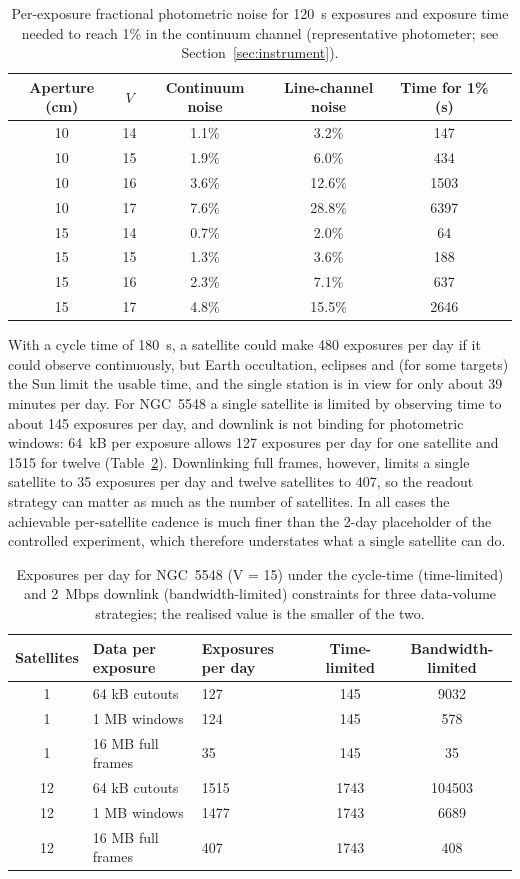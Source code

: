 \documentclass[11pt]{article}
\begin{document}
\begin{table}[htbp]
\centering
\small
\caption{Per-exposure fractional photometric noise for 120~s exposures and exposure time needed to reach 1\% in the continuum channel (representative photometer; see Section~\ref{sec:instrument}).}
\label{tab:budget}
\begin{tabular}{@{}cccccc@{}}
\toprule
Aperture (cm) & $V$ & Continuum noise & Line-channel noise & Time for 1\% (s) \\
\midrule
10 & 14 & 1.1\% & 3.2\% & 147 \\
10 & 15 & 1.9\% & 6.0\% & 434 \\
10 & 16 & 3.6\% & 12.6\% & 1503 \\
10 & 17 & 7.6\% & 28.8\% & 6397 \\
15 & 14 & 0.7\% & 2.0\% & 64 \\
15 & 15 & 1.3\% & 3.6\% & 188 \\
15 & 16 & 2.3\% & 7.1\% & 637 \\
15 & 17 & 4.8\% & 15.5\% & 2646 \\
\bottomrule
\end{tabular}
\end{table}

With a cycle time of 180~s, a satellite could make 480 exposures per day if it could observe continuously, but Earth occultation, eclipses and (for some targets) the Sun limit the usable time, and the single station is in view for only about 39 minutes per day. For NGC~5548 a single satellite is limited by observing time to about 145 exposures per day, and downlink is not binding for photometric windows: 64~kB per exposure allows 127 exposures per day for one satellite and 1515 for twelve (Table~\ref{tab:downlink}). Downlinking full frames, however, limits a single satellite to 35 exposures per day and twelve satellites to 407, so the readout strategy can matter as much as the number of satellites. In all cases the achievable per-satellite cadence is much finer than the 2-day placeholder of the controlled experiment, which therefore understates what a single satellite can do.

\begin{table}[htbp]
\centering
\small
\caption{Exposures per day for NGC~5548 (V = 15) under the cycle-time (time-limited) and 2~Mbps downlink (bandwidth-limited) constraints for three data-volume strategies; the realised value is the smaller of the two.}
\label{tab:downlink}
\begin{tabular}{@{}cllcc@{}}
\toprule
Satellites & Data per exposure & Exposures per day & Time-limited & Bandwidth-limited \\
\midrule
1 & 64 kB cutouts & 127 & 145 & 9032 \\
1 & 1 MB windows & 124 & 145 & 578 \\
1 & 16 MB full frames & 35 & 145 & 35 \\
12 & 64 kB cutouts & 1515 & 1743 & 104503 \\
12 & 1 MB windows & 1477 & 1743 & 6689 \\
12 & 16 MB full frames & 407 & 1743 & 408 \\
\bottomrule
\end{tabular}
\end{table}
\end{document}
